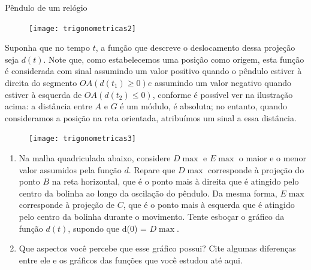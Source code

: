 \begin{task}{Pêndulo de um relógio}
\begin{figure}[H]
\texttt{[image: trigonometricas2]}
\end{figure}

Suponha que no tempo $t$, a função que descreve o deslocamento dessa projeção seja $d(t)$. Note que, como estabelecemos uma posição como origem, esta função é considerada com sinal assumindo um valor positivo quando o pêndulo estiver à direita do segmento $OA(d(t_1)\geq0)e$ assumindo um valor negativo quando estiver à esquerda de $OA(d(t_2)\leq0)$, conforme é possível ver na ilustração acima: a distância entre $A$ e $G$ é um módulo, é absoluta; no entanto, quando consideramos a posição na reta orientada, atribuímos um sinal a essa distância.

\begin{figure}[H]
\centering

\texttt{[image: trigonometricas3]}
\end{figure}

\begin{enumerate}
\item Na malha quadriculada abaixo, considere $D\max$ e $E\max$ o maior e o menor valor assumidos pela função $d$. Repare que $D\max$ corresponde à projeção do ponto $B$ na reta horizontal, que é o ponto mais à direita que é atingido pelo centro da bolinha ao longo da oscilação do pêndulo. Da mesma forma, $E\max$ corresponde à projeção de $C$, que é o ponto mais à esquerda que é atingido pelo centro da bolinha durante o movimento. Tente esboçar o gráfico da função $d(t)$, supondo que d(0) = $D\max$.

\begin{figure}[H]
\centering

\resizebox{.75\linewidth}{!}
{
}
\end{figure}

\item Que aspectos você percebe que esse gráfico possui? Cite algumas diferenças entre ele e os gráficos das funções que você estudou até aqui.
\end{enumerate}
\end{task}

